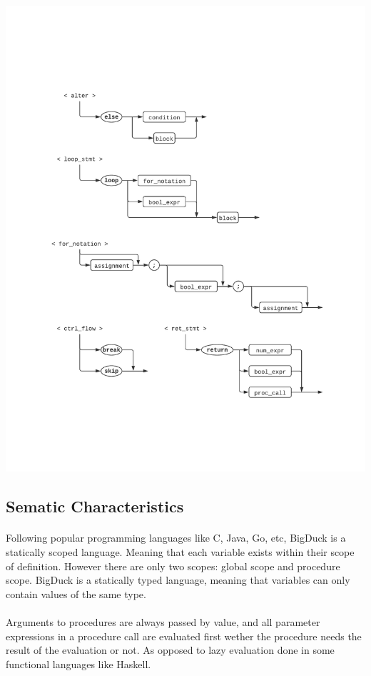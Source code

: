 \documentclass[12pt, titlepage]{article}
\begin{document}
\newpage
\includegraphics[trim={1in, 1in, 1in, 1in}, clip, scale=0.95]{d6}
\newpage

\subsection{Sematic Characteristics}\label{semantics}
\paragraph{} Following popular programming languages like C, Java, Go, etc,
BigDuck is a statically scoped language. Meaning that each variable exists
within their scope of definition. However there are only two scopes: global
scope and procedure scope. BigDuck is a statically typed language, meaning that 
variables can only contain values of the same type.

\paragraph{} Arguments to procedures are always passed by value, and all 
parameter expressions in a procedure call are evaluated first wether the
procedure needs the result of the evaluation or not. As opposed to lazy 
evaluation done in some functional languages like Haskell.
\end{document}
